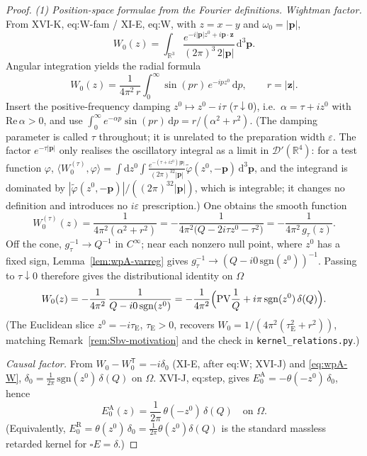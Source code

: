 \documentclass{article}
\theoremstyle{remark}
\begin{document}
\begin{proof}
\emph{(1) Position-space formulae from the Fourier definitions.}
\textit{Wightman factor.}
From XVI-K, eq:W-fam / XI-E, eq:W, with $z=x-y$ and $\omega_0=|\mathbf p|$,
\[
W_0(z)
=\int_{\mathbb R^3}\frac{e^{-i|\mathbf p|z^0+i\mathbf p\cdot\mathbf z}}{(2\pi)^3\,2|\mathbf p|}\,\mathrm d^3\mathbf p .
\]
Angular integration yields the radial formula
\[
W_0(z)=\frac1{4\pi^2\,r}\int_0^\infty\sin(pr)\,e^{-ipz^0}\,\mathrm dp,
\qquad r=|\mathbf z|.
\]
Insert the positive-frequency damping $z^0\mapsto z^0-i\tau$ ($\tau\downarrow0$), i.e.\ $\alpha=\tau+iz^0$ with $\mathrm{Re}\,\alpha>0$, and use
$\int_0^\infty e^{-\alpha p}\sin(pr)\,\mathrm dp=r/(\alpha^2+r^2)$.
(The damping parameter is called $\tau$ throughout; it is unrelated to the preparation width $\varepsilon$. The factor $e^{-\tau|\mathbf p|}$ only realises the oscillatory integral as a limit in $\mathcal D'(\mathbb R^4)$: for a test function $\varphi$, $\langle W_0^{(\tau)},\varphi\rangle=\int\mathrm dz^0\int\frac{e^{-(\tau+iz^0)|\mathbf p|}}{(2\pi)^32|\mathbf p|}\tilde\varphi(z^0,-\mathbf p)\,\mathrm d^3\mathbf p$, and the integrand is dominated by $|\tilde\varphi(z^0,-\mathbf p)|/((2\pi)^32|\mathbf p|)$, which is integrable; it changes no definition and introduces no $i\varepsilon$ prescription.)
One obtains the smooth function
\[
W_0^{(\tau)}(z)=\frac1{4\pi^2(\alpha^2+r^2)}
=-\frac1{4\pi^2\bigl(Q-2i\tau z^0-\tau^2\bigr)}=-\frac1{4\pi^2\,g_\tau(z)} .
\]
Off the cone, $g_\tau^{-1}\to Q^{-1}$ in $C^\infty$; near each nonzero null point, where $z^0$ has a fixed sign, Lemma~\ref{lem:wpA-varreg} gives $g_\tau^{-1}\to(Q-i0\,\mathrm{sgn}(z^0))^{-1}$.
Passing to $\tau\downarrow0$ therefore gives the distributional identity on $\Omega$
\begin{equation}
\label{eq:wpA-W}
W_0(z)
=-\frac1{4\pi^2}\,\frac1{Q-i0\,\mathrm{sgn}(z^0)}
=-\frac1{4\pi^2}\Bigl(\mathrm{PV}\frac1Q+i\pi\,\mathrm{sgn}(z^0)\,\delta(Q)\Bigr).
\end{equation}
(The Euclidean slice $z^0=-i\tau_{\mathrm E}$, $\tau_{\mathrm E}>0$, recovers $W_0=1/(4\pi^2(\tau_{\mathrm E}^2+r^2))$, matching Remark~\ref{rem:Sbv-motivation} and the check in \texttt{kernel\_relations.py}.)

\textit{Causal factor.}
From $W_0-W_0^{\mathsf T}=-i\delta_0$ (XI-E, after eq:W; XVI-J) and \eqref{eq:wpA-W},
$\delta_0=\frac1{2\pi}\,\mathrm{sgn}(z^0)\,\delta(Q)$ on $\Omega$.
XVI-J, eq:step, gives $E_0^{\mathrm A}=-\theta(-z^0)\,\delta_0$, hence
\begin{equation}
\label{eq:wpA-EA}
E_0^{\mathrm A}(z)=\frac1{2\pi}\,\theta(-z^0)\,\delta(Q)
\quad\text{on }\Omega .
\end{equation}
(Equivalently, $E_0^{\mathrm R}=\theta(z^0)\,\delta_0=\frac1{2\pi}\theta(z^0)\delta(Q)$ is the standard massless retarded kernel for $\square E=\delta$.)


\end{proof}
\end{document}
